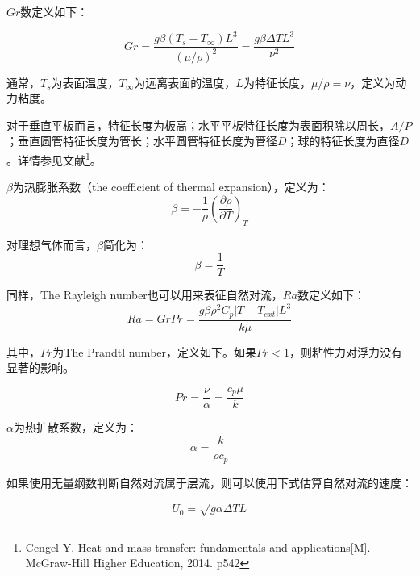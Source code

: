 $Gr$数定义如下：

\begin{equation}
Gr = \frac{g\beta (T_s - T_\infty)L^3}{(\mu/\rho)^2} = \frac{g\beta\Delta T L^3}{\nu^2}
\end{equation}

通常，$ T_s $为表面温度，$ T_\infty $为远离表面的温度，$ L $为特征长度，$\mu/\rho=\nu$，定义为动力粘度。

对于垂直平板而言，特征长度为板高；水平平板特征长度为表面积除以周长，$ A/P $；垂直圆管特征长度为管长；水平圆管特征长度为管径$ D $；球的特征长度为直径$ D $。详情参见文献\footnote{Cengel Y. Heat and mass transfer: fundamentals and applications[M]. McGraw-Hill Higher Education, 2014. p542}。

$\beta$为热膨胀系数（the coefficient of thermal expansion），定义为：
\begin{equation}
    \beta = -\frac{1}{\rho} \left( \frac{\partial \rho}{\partial T} \right)_T
\end{equation}

对理想气体而言，$\beta$简化为：
\begin{equation}
    \beta = \frac{1}{T}
\end{equation}

同样，The Rayleigh number也可以用来表征自然对流，$Ra$数定义如下：
\begin{equation}
    Ra = GrPr =\frac{g\beta\rho^2 C_p |T-T_{ext}|L^3}{k\mu}
\end{equation}

其中，$Pr$为The Prandtl number，定义如下。如果$ Pr<1 $，则粘性力对浮力没有显著的影响。

\begin{equation}
    Pr = \frac{\nu}{\alpha} = \frac{c_p\mu}{k}
\end{equation}

$\alpha$为热扩散系数，定义为：
\begin{equation}
    \alpha = \frac{k}{\rho c_p}
\end{equation}


如果使用无量纲数判断自然对流属于层流，则可以使用下式估算自然对流的速度：

\begin{equation}
U_0 =\sqrt{g\alpha\Delta T L}
\end{equation}

